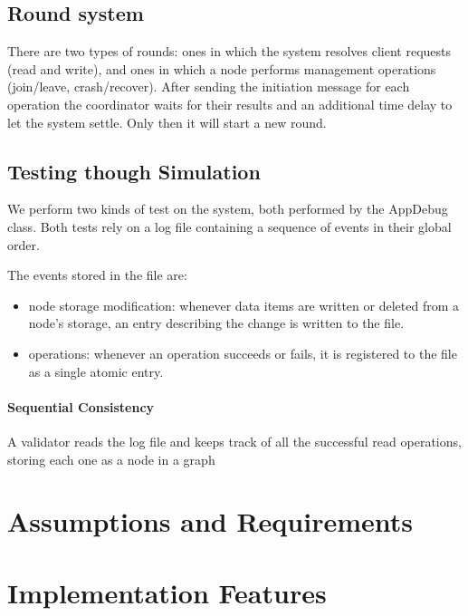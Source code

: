 \documentclass{article}
\begin{document}
\subsection{Round system}
There are two types of rounds: ones in which the system resolves client 
requests (read and write), and ones in which a node performs management 
operations (join/leave, crash/recover).
After sending the initiation message for each operation the coordinator waits 
for their results and an additional time delay to let the system settle. 
Only then it will start a new round.

\subsection{Testing though Simulation}
We perform two kinds of test on the system, both performed by the AppDebug class. 
Both tests rely on a log file containing a sequence of events in their global order.

The events stored in the file are:
\begin{itemize}
    \item node storage modification: whenever data items are written or deleted 
    from a node's storage, an entry describing the change is written to the file.
    \item operations: whenever an operation succeeds or fails, it is registered 
    to the file as a single atomic entry.
\end{itemize}

\paragraph {Sequential Consistency}
A validator reads the log file and keeps track of all the successful read 
operations, storing each one as a node in a graph


\section{Assumptions and Requirements}

\section{Implementation Features}
\end{document}
